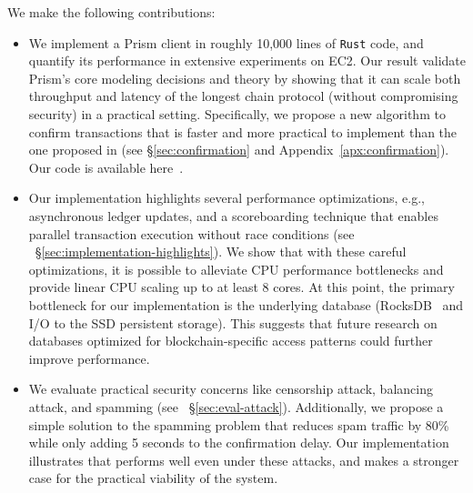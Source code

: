 We make the following contributions:
\begin{itemize}
    \item We implement a Prism client in roughly 10,000 lines of {\tt Rust} code, and quantify its performance in extensive experiments on EC2. Our result validate Prism's core modeling decisions and theory by showing that it can scale both throughput and latency of the longest chain protocol (without compromising security) in a practical setting. Specifically, we propose a new algorithm to confirm transactions that is faster and more practical to implement than the one proposed in \cite{prism-theory} (see \S\ref{sec:confirmation} and Appendix~\ref{apx:confirmation}). Our code is available here~\cite{prismcode}.
    
    \item Our implementation highlights several performance optimizations, e.g., asynchronous ledger updates, and a scoreboarding technique that enables parallel transaction execution without race conditions (see ~\S\ref{sec:implementation-highlights}). We show that with these careful optimizations, it is possible to alleviate CPU performance bottlenecks and provide linear CPU scaling up to at least 8 cores. At this point, the primary bottleneck for our implementation is the underlying database (RocksDB~\cite{rocksdb} and I/O to the SSD persistent storage). This suggests that future research on databases optimized for blockchain-specific access patterns could further improve performance. 
    
    \item We evaluate practical security concerns like censorship attack, balancing attack, and spamming (see ~\S\ref{sec:eval-attack}). Additionally, we propose a simple solution to the spamming problem that reduces spam traffic by 80\% while only adding 5 seconds to the confirmation delay. Our implementation illustrates that \prism performs well even under these attacks, and makes a stronger case for the practical viability of the system.
    
\end{itemize}



